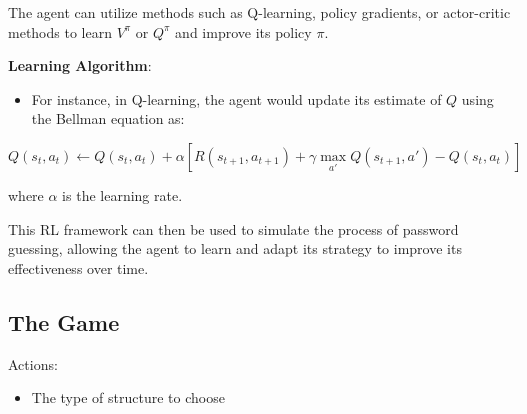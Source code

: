 The agent can utilize methods such as Q-learning, policy gradients, or
actor-critic methods to learn \(V^\pi\) or \(Q^\pi\) and improve its
policy \(\pi\).

\textbf{Learning Algorithm}:

\begin{itemize}
\item
  For instance, in Q-learning, the agent would update its estimate of
  \(Q\) using the Bellman equation as:
\end{itemize}

\[Q(s_t, a_t) \leftarrow Q(s_t, a_t) + \alpha [R(s_{t+1}, a_{t+1}) + \gamma \max_{a'}Q(s_{t+1}, a') - Q(s_t, a_t)]\]

where \(\alpha\) is the learning rate.

This RL framework can then be used to simulate the process of password
guessing, allowing the agent to learn and adapt its strategy to improve
its effectiveness over time.

\subsection{The Game}

Actions:

\begin{itemize}
    \item The type of structure to choose
\end{itemize}